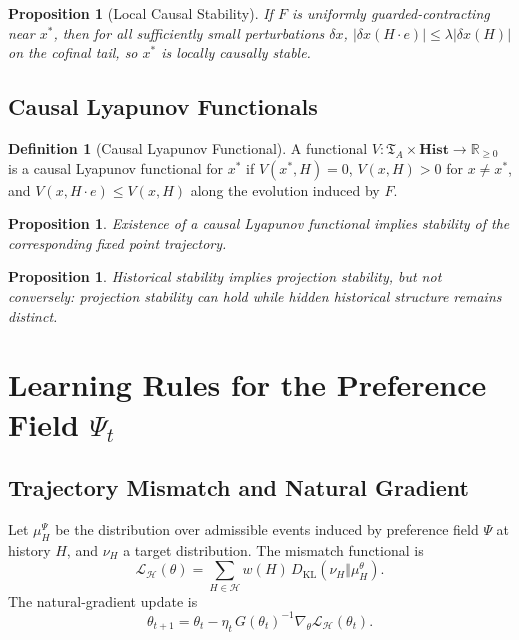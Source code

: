 \documentclass[11pt,a4paper]{article}
\newtheorem{proposition}[theorem]{Proposition}
\theoremstyle{definition}
\newtheorem{definition}[theorem]{Definition}
\theoremstyle{remark}
\begin{document}
\begin{proposition}[Local Causal Stability]
If $F$ is uniformly guarded-contracting near $x^\ast$, then for all sufficiently small perturbations $\delta x$, $|\delta x(H \cdot e)| \leq \lambda |\delta x(H)|$ on the cofinal tail, so $x^\ast$ is locally causally stable.
\end{proposition}

\subsection{Causal Lyapunov Functionals}

\begin{definition}[Causal Lyapunov Functional]
A functional $V : \mathfrak{T}_A \times \mathbf{Hist} \to \mathbb{R}_{\geq 0}$ is a causal Lyapunov functional for $x^\ast$ if $V(x^\ast, H) = 0$, $V(x, H) > 0$ for $x \neq x^\ast$, and $V(x, H \cdot e) \leq V(x, H)$ along the evolution induced by $F$.
\end{definition}

\begin{proposition}
Existence of a causal Lyapunov functional implies stability of the corresponding fixed point trajectory.
\end{proposition}

\begin{proposition}
Historical stability implies projection stability, but not conversely: projection stability can hold while hidden historical structure remains distinct.
\end{proposition}

\section{Learning Rules for the Preference Field $\Psi_t$}

\subsection{Trajectory Mismatch and Natural Gradient}

Let $\mu_H^\Psi$ be the distribution over admissible events induced by preference field $\Psi$ at history $H$, and $\nu_H$ a target distribution. The mismatch functional is
\[
\mathcal{L}_{\mathcal{H}}(\theta) = \sum_{H \in \mathcal{H}} w(H)\, D_{\mathrm{KL}}(\nu_H \Vert \mu_H^\theta).
\]
The natural-gradient update is
\[
\theta_{t+1} = \theta_t - \eta_t\, G(\theta_t)^{-1} \nabla_\theta \mathcal{L}_{\mathcal{H}}(\theta_t).
\]
\end{document}
